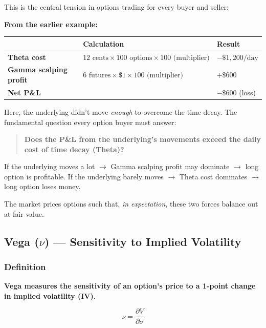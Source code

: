 \documentclass[12pt,openany]{book}
\begin{document}
This is the central tension in options trading for every buyer and seller:

\textbf{From the earlier example:}
\begin{center}
\scriptsize
\setlength{\tabcolsep}{3pt}
\begin{tabular}{|L{4.1cm}|L{4.1cm}|L{4.1cm}|}
\hline
\textbf{} & \textbf{Calculation} & \textbf{Result} \\
\hline
\textbf{Theta cost} & \(12 \text{ cents} \times 100 \text{ options} \times 100 \text{ (multiplier)}\) & \(-\$1,200/\text{day}\) \\
\hline
\textbf{Gamma scalping profit} & \(6 \text{ futures} \times \$1 \times 100 \text{ (multiplier)}\) & \(+\$600\) \\
\hline
\textbf{Net P\&L} &  & \(-\$600\) (loss) \\
\hline
\end{tabular}
\end{center}

Here, the underlying didn't move \emph{enough} to overcome the time decay. The fundamental question every option buyer must answer:

\begin{quote}
\textbf{Does the P\&L from the underlying's movements exceed the daily cost of time decay (Theta)?}
\end{quote}

If the underlying moves a lot \(\rightarrow\) Gamma scalping profit may dominate \(\rightarrow\) long option is profitable.
If the underlying barely moves \(\rightarrow\) Theta cost dominates \(\rightarrow\) long option loses money.

The market prices options such that, \emph{in expectation}, these two forces balance out at fair value.

\subsection{Vega (\texorpdfstring{\(\nu\)}{nu}) — Sensitivity to Implied Volatility}

\subsubsection{Definition}

\textbf{Vega measures the sensitivity of an option's price to a 1-point change in implied volatility (IV).}

\[
\nu = \frac{\partial V}{\partial \sigma}
\]
\end{document}
